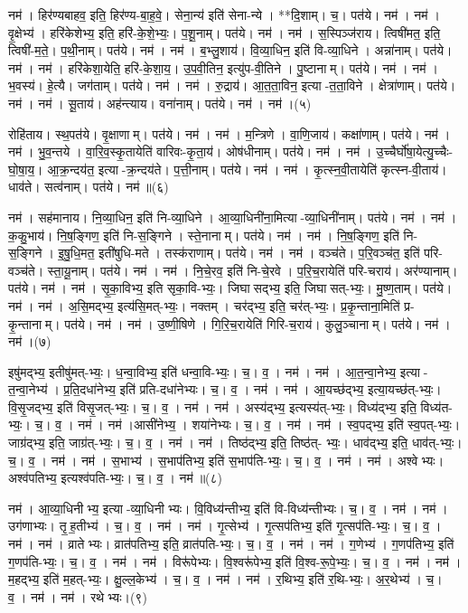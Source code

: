 नम॑। हिर॑ण्यबाहव॒ इति॒ हिर॑ण्य-बा॒ह॒वे॒। सेना॒न्य॑ इति॑ सेना-न्ये। **दि॒शाम्। च॒। पत॑ये। नम॑।
नम॑। वृ॒क्षेभ्य॑। हरि॑केशेभ्य॒ इति॒ हरि॑-के॒शे॒भ्यः॒। प॒शू॒नाम्। पत॑ये। नम॑।
नम॑। स॒स्पिञ्ज॑राय। त्विषी॑मत॒ इति॒ त्विषी॑-म॒ते॒। प॒थी॒नाम्। पत॑ये। नम॑।
नम॑। ब॒भ्लु॒शाय॑। वि॒व्या॒धिन॒ इति॑ वि-व्या॒धिने। अन्ना॑नाम्। पत॑ये। नम॑।
नम॑। हरि॑केशा॒येति॒ हरि॑-के॒शा॒य॒। उ॒प॒वी॒तिन॒ इत्यु॑प-वी॒तिने। पु॒ष्टानाम्। पत॑ये। नम॑।
नम॑। भ॒वस्य॑। हे॒त्यै। जग॑ताम्। पत॑ये। नम॑।
नम॑। रु॒द्राय॑। आ॒त॒ता॒विन॒ इत्या-त॒ता॒विने। क्षेत्रा॑णाम्। पत॑ये। नम॑।
नम॑। सू॒ताय॑। अह॑न्त्याय। वना॑नाम्। पत॑ये। नम॑।
नम॑।(५)


रोहि॑ताय। स्थ॒पत॑ये। वृ॒क्षाणाम्। पत॑ये। नम॑।
नम॑। म॒न्त्रिणे। वा॒णि॒जाय॑। कक्षा॑णाम्। पत॑ये। नम॑।
नम॑। भु॒व॒न्तये। वा॒रि॒व॒स्कृ॒तायेति॑ वारिवः-कृ॒ता॒य॑। ओष॑धीनाम्। पत॑ये। नम॑। 
नम॑। उ॒च्चैर्घो॑षा॒येत्यु॒च्चैः-घो॒षा॒य॒। आ॒क्र॒न्दय॑त॒ इत्या-क्र॒न्दय॑ते। प॒त्ती॒नाम्। पत॑ये। नम॑।
नम॑। कृ॒त्स्न॒वी॒तायेति॑ कृत्स्न-वी॒ताय॑। धाव॑ते। सत्व॑नाम्। पत॑ये। नम॑॥(६)


नम॑। सह॑मानाय। नि॒व्या॒धिन॒ इति॑ नि-व्या॒धिने। आ॒व्या॒धिनी॑ना॒मित्या-व्या॒धिनी॑नाम्। पत॑ये। नम॑।
नम॑। क॒कु॒भाय॑। नि॒ष॒ङ्गिण॒ इति॑ नि-स॒ङ्गिने। स्ते॒नानाम्। पत॑ये। नम॑।
नम॑। नि॒ष॒ङ्गिण॒ इति॑ नि-स॒ङ्गिने। इ॒षु॒धि॒मत॒ इती॑षुधि-मते। तस्क॑राणाम्। पत॑ये। नम॑।
नम॑। वञ्च॑ते। प॒रि॒वञ्च॑त॒ इति॑ परि-वञ्च॑ते। स्ता॒यू॒नाम्। पत॑ये। नम॑।
नम॑। नि॒चे॒रव॒ इति॑ नि-चे॒रवे। प॒रि॒च॒रायेति॑ परि-चराय॑। अर॑ण्यानाम्। पत॑ये। नम॑।
नम॑। सृ॒का॒विभ्य॒ इति सृका॒वि-भ्यः॒। जिघासद्भ्य॒ इति॒ जिघासत्-भ्यः॒। मु॒ष्ण॒ताम्। पत॑ये। नम॑।
नम॑। अ॒सि॒मद्भ्य॒ इत्य॑सि॒मत्-भ्यः॒। नक्तम्। चर॑द्भ्य॒ इति॒ चर॑त्-भ्यः॒। प्र॒कृ॒न्ताना॒मिति॑ प्र-कृ॒न्तानाम्। पत॑ये। नम॑।
नम॑। उ॒ष्णी॒षिणे। गि॒रि॒च॒रायेति॑ गिरि-च॒राय॑। कुलु॒ञ्चानाम्। पत॑ये। नम॑। नम॑।(७)


इषु॑मद्भ्य॒ इतीषु॑मत्-भ्यः॒। ध॒न्वा॒विभ्य॒ इति॑ धन्वा॒वि-भ्यः॒। च॒। व॒। नम॑।
नम॑। आ॒त॒न्वा॒नेभ्य॒ इत्या-त॒न्वा॒नेभ्य॑। प्र॒ति॒दधा॑नेभ्य॒ इति॑ प्रति-दधा॑नेभ्यः। च॒। व॒। नम॑।
नम॑। आ॒यच्छ॑द्भ्य॒ इत्या॒यच्छ॑त्-भ्यः॒। वि॒सृ॒जद्भ्य॒ इति॑ विसृ॒जत्-भ्यः॒। च॒। व॒। नम॑।
नम॑। अस्य॑द्भ्य॒ इत्यस्य॑त्-भ्यः॒। विध्य॑द्भ्य॒ इति॒ विध्य॑त-भ्यः॒। च॒। व॒। नम॑।
नम॑।आसी॑नेभ्य॒। शया॑नेभ्यः। च॒। व॒। नम॑।
नम॑। स्व॒पद्भ्य॒ इति॑ स्व॒पत्-भ्यः॒। जाग्र॑द्भ्य॒ इति॒ जाग्र॑त्-भ्यः॒। च॒। व॒। नम॑।
नम॑। तिष्ठ॑द्भ्य॒ इति॒ तिष्ठ॑त्- भ्यः॒। धाव॑द्भ्य॒ इति॒ धाव॑त्-भ्यः॒। च॒। व॒। नम॑।
नम॑। स॒भाभ्य॑। स॒भाप॑तिभ्य॒ इति॑ स॒भाप॑ति-भ्यः॒। च॒। व॒। नम॑।
नम॑। अश्वेभ्यः। अश्व॑पतिभ्य॒ इत्यश्व॑पति-भ्यः॒। च॒। व॒। नम॑॥(८)


नम॑। आ॒व्या॒धिनीभ्य॒ इत्या-व्या॒धिनीभ्यः। वि॒विध्य॑न्तीभ्य॒ इति॑ वि-विध्य॑न्तीभ्यः। च॒। व॒। नम॑। नम॑। उग॑णाभ्यः। तृ॒ह॒तीभ्य॑। च॒। व॒। नम॑।
नम॑। गृ॒त्सेभ्य॑। गृ॒त्सप॑तिभ्य॒ इति॑ गृ॒त्सप॑ति-भ्यः॒। च॒। व॒। नम॑।
नम॑। व्रातेभ्यः। व्रात॑पतिभ्य॒ इति॒ व्रात॑पति-भ्यः॒। च॒। व॒। नम॑।
नम॑। ग॒णेभ्य॑। ग॒णप॑तिभ्य॒ इति॑ ग॒णप॑ति-भ्यः॒। च॒। व॒। नम॑।
नम॑। विरू॑पेभ्यः। वि॒श्वरू॑पेभ्य॒ इति॑ वि॒श्व-रू॒पे॒भ्यः॒। च॒। व॒। नम॑।
नम॑। म॒हद्भ्य॒ इति॑ म॒हत्-भ्यः॒। क्षु॒ल्ल॒केभ्य॑। च॒। व॒। नम॑।
नम॑। र॒थिभ्य॒ इति॑ र॒थि-भ्यः॒। अ॒र॒थेभ्य॑। च॒। व॒। नम॑।
नम॑। रथेभ्यः।(९)


